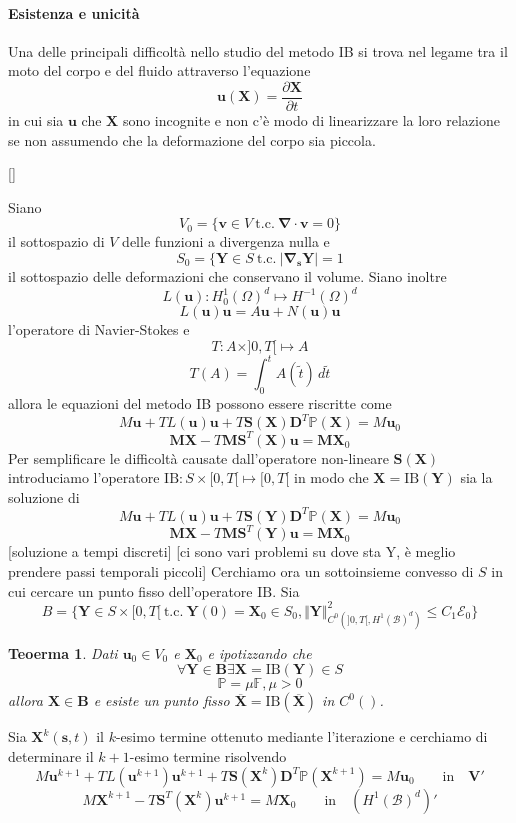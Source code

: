 \documentclass{book}
\newtheorem{theorem}{Teoerma}[section]
\newenvironment{proof}[1][Dimostrazione]{\begin{trivlist}
\item[\hskip \labelsep {\bfseries #1}]}{\end{trivlist}}
\newcommand{\Nabla}{\boldsymbol{\nabla}}
\newcommand{\tc}{\ \text{t.c.}\ }
\begin{document}
\paragraph{Esistenza e unicità}
Una delle principali difficoltà nello studio del metodo IB si trova nel legame tra il moto del corpo e del fluido attraverso l'equazione 
$$\mathbf{u}(\mathbf{X})=\frac{\partial\mathbf{X}}{\partial t}$$
in cui sia $\mathbf{u}$ che $\mathbf{X}$ sono incognite e non c'è modo di linearizzare la loro relazione se non assumendo che la deformazione del corpo sia piccola.

[]

Siano $$V_0=\{\mathbf{v}\in V\tc\Nabla\cdot\mathbf{v}=0 \}$$ il sottospazio di $V$ delle funzioni a divergenza nulla e $$S_0=\{\mathbf{Y}\in S\tc\vert\Nabla_{\mathbf{s}}\mathbf{Y}\vert=1$$ il sottospazio delle deformazioni che conservano il volume. Siano inoltre
$$L(\mathbf{u}):H^1_0(\Omega)^d\mapsto H^{-1}(\Omega)^d$$
$$L(\mathbf{u})\mathbf{u}=A\mathbf{u}+N(\mathbf{u})\mathbf{u}$$
l'operatore di Navier-Stokes e 
$$T:A\times]0,T[\mapsto A$$
$$T(A)=\int^t_0A(\tilde{t})\, d\tilde{t}$$
allora le equazioni del metodo IB possono essere riscritte come
$$M\mathbf{u}+TL(\mathbf{u})\mathbf{u}+T\mathbf{S}(\mathbf{X})\mathbf{D}^T\mathbb{P}(\mathbf{X})=M\mathbf{u}_0$$
$$\mathbf{M}\mathbf{X}-T\mathbf{M}\mathbf{S}^T(\mathbf{X})\mathbf{u}=\mathbf{M}\mathbf{X}_0$$
Per semplificare le difficoltà causate dall'operatore non-lineare  $\mathbf{S}(\mathbf{X})$ introduciamo l'operatore $\text{IB}:S\times[0,T[\mapsto[0,T[$ in modo che $\mathbf{X}=\text{IB}(\mathbf{Y})$ sia la soluzione di
$$M\mathbf{u}+TL(\mathbf{u})\mathbf{u}+T\mathbf{S}(\mathbf{Y})\mathbf{D}^T\mathbb{P}(\mathbf{X})=M\mathbf{u}_0$$
$$\mathbf{M}\mathbf{X}-T\mathbf{M}\mathbf{S}^T(\mathbf{Y})\mathbf{u}=\mathbf{M}\mathbf{X}_0$$
 [soluzione a tempi discreti]
 [ci sono vari problemi su dove sta Y, è meglio prendere passi temporali piccoli]
Cerchiamo ora un sottoinsieme convesso di $S$ in cui cercare un punto fisso dell'operatore $\text{IB}$. Sia 
$$B=\{ \mathbf{Y}\in S\times[0,T[\tc\mathbf{Y}(0)=\mathbf{X}_0\in S_0,\Vert\mathbf{Y}\Vert^2_{C^0(]0,T[,H^1(\mathcal{B})^d)}\leq C_1\mathcal{E}_0\}$$
\begin{theorem}
Dati $\mathbf{u}_0\in V_0$ e $\mathbf{X}_0$ e ipotizzando che
$$\forall\mathbf{Y}\in\mathbf{B}\exists\mathbf{X}=\text{IB}(\mathbf{Y})\in S$$
$$\mathbb{P}=\mu\mathbb{F}, \mu>0$$
allora $\mathbf{X}\in\mathbf{B}$ e esiste un punto fisso $\overline{\mathbf{X}}=\text{IB}(\overline{\mathbf{X}})$ in $C^0()$.
\end{theorem}
\begin{proof}
Sia $\mathbf{X}^{k}(\mathbf{s},t)$ il $k$-esimo termine ottenuto mediante l'iterazione e cerchiamo di determinare il $k+1$-esimo termine risolvendo
$$M\mathbf{u}^{k+1}+TL(\mathbf{u}^{k+1})\mathbf{u}^{k+1}+T\mathbf{S}(\mathbf{X}^{k})\mathbf{D}^{T}\mathbb{P}(\mathbf{X}^{k+1})=M\mathbf{u}_{0}\qquad\text{in}\quad\mathbf{V }'$$
$$M\mathbf{X}^{k+1}-T\mathbf{S}^{T}(\mathbf{X}^{k})\mathbf{u}^{k+1} = M\mathbf{X}_0\qquad\text{in}\quad (H^{1}(\mathcal{B})^{d})'$$
\end{proof}
\end{document}
